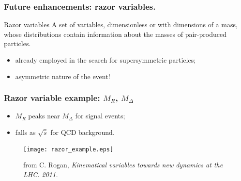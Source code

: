 \documentclass[ukenglish]{beamer}
\begin{document}
\begin{frame}
    \frametitle{Future enhancements: razor variables.}
    \begin{block}
        {Razor variables}
        A set of variables, dimensionless or with dimensions of a mass,
        whose distributions contain information about the masses of
        pair-produced particles. 
    \end{block}
    \begin{itemize}
        \item already employed in the search for supersymmetric particles;
        \item \alert{asymmetric nature of the event!}
    \end{itemize}
\end{frame}
\begin{frame}
    \frametitle{Razor variable example: $M_R$, $M_\Delta$}
    \begin{itemize}
        \item $M_R$ peaks near $M_\Delta$ for signal events;
        \item falls as $\sqrt{\hat{s}}$ for QCD background.
    \end{itemize}
    \begin{figure}[h]
        \begin{center}
            \texttt{[image: razor\_example.eps]}
            \caption{from C. Rogan, \emph{Kinematical variables towards new
            dynamics at the LHC. 2011.}}
        \end{center}
    \end{figure}
\end{frame}
\end{document}
